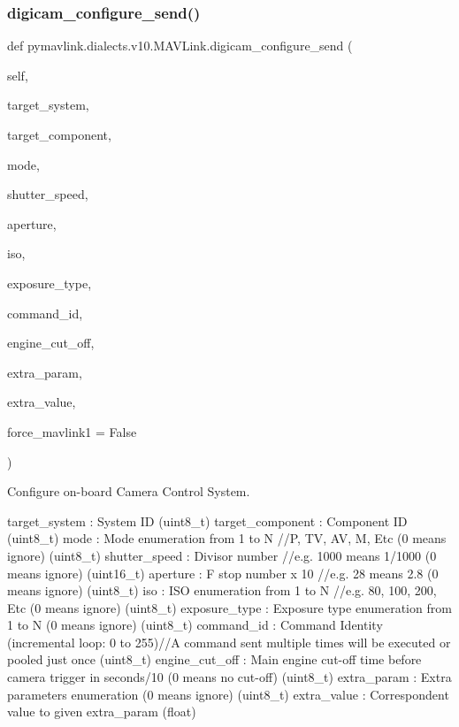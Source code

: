 \begin{DoxyVerb}
\begin{DoxyVerb}
\subsubsection{\texorpdfstring{digicam\+\_\+configure\+\_\+send()}{digicam\_configure\_send()}}
{\footnotesize\ttfamily def pymavlink.\+dialects.\+v10.\+M\+A\+V\+Link.\+digicam\+\_\+configure\+\_\+send (\begin{DoxyParamCaption}\item[{}]{self,  }\item[{}]{target\+\_\+system,  }\item[{}]{target\+\_\+component,  }\item[{}]{mode,  }\item[{}]{shutter\+\_\+speed,  }\item[{}]{aperture,  }\item[{}]{iso,  }\item[{}]{exposure\+\_\+type,  }\item[{}]{command\+\_\+id,  }\item[{}]{engine\+\_\+cut\+\_\+off,  }\item[{}]{extra\+\_\+param,  }\item[{}]{extra\+\_\+value,  }\item[{}]{force\+\_\+mavlink1 = {\ttfamily False} }\end{DoxyParamCaption})}

\begin{DoxyVerb}Configure on-board Camera Control System.

target_system             : System ID (uint8_t)
target_component          : Component ID (uint8_t)
mode                      : Mode enumeration from 1 to N //P, TV, AV, M, Etc (0 means ignore) (uint8_t)
shutter_speed             : Divisor number //e.g. 1000 means 1/1000 (0 means ignore) (uint16_t)
aperture                  : F stop number x 10 //e.g. 28 means 2.8 (0 means ignore) (uint8_t)
iso                       : ISO enumeration from 1 to N //e.g. 80, 100, 200, Etc (0 means ignore) (uint8_t)
exposure_type             : Exposure type enumeration from 1 to N (0 means ignore) (uint8_t)
command_id                : Command Identity (incremental loop: 0 to 255)//A command sent multiple times will be executed or pooled just once (uint8_t)
engine_cut_off            : Main engine cut-off time before camera trigger in seconds/10 (0 means no cut-off) (uint8_t)
extra_param               : Extra parameters enumeration (0 means ignore) (uint8_t)
extra_value               : Correspondent value to given extra_param (float)\end{DoxyVerb}
 \mbox{\label{classpymavlink_1_1dialects_1_1v10_1_1MAVLink_a028057b7bdb567104ad78eb818e7442f}} 

\end{DoxyVerb}
\end{DoxyVerb}
